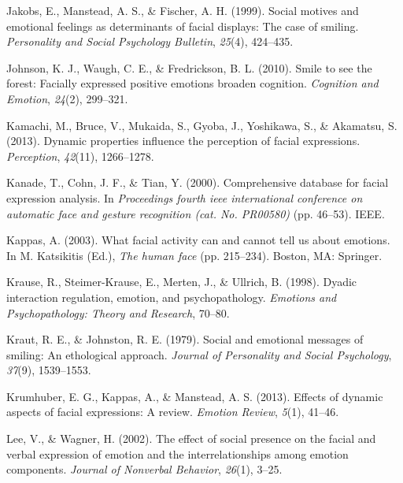 \documentclass[man]{apa6}
\begin{document}
\leavevmode\hypertarget{ref-jakobs1999social}{}%
Jakobs, E., Manstead, A. S., \& Fischer, A. H. (1999). Social motives and emotional feelings as determinants of facial displays: The case of smiling. \emph{Personality and Social Psychology Bulletin}, \emph{25}(4), 424--435.

\leavevmode\hypertarget{ref-johnson2010smile}{}%
Johnson, K. J., Waugh, C. E., \& Fredrickson, B. L. (2010). Smile to see the forest: Facially expressed positive emotions broaden cognition. \emph{Cognition and Emotion}, \emph{24}(2), 299--321.

\leavevmode\hypertarget{ref-kamachi2013dynamic}{}%
Kamachi, M., Bruce, V., Mukaida, S., Gyoba, J., Yoshikawa, S., \& Akamatsu, S. (2013). Dynamic properties influence the perception of facial expressions. \emph{Perception}, \emph{42}(11), 1266--1278.

\leavevmode\hypertarget{ref-kanade2000comprehensive}{}%
Kanade, T., Cohn, J. F., \& Tian, Y. (2000). Comprehensive database for facial expression analysis. In \emph{Proceedings fourth ieee international conference on automatic face and gesture recognition (cat. No. PR00580)} (pp. 46--53). IEEE.

\leavevmode\hypertarget{ref-kappas2003facial}{}%
Kappas, A. (2003). What facial activity can and cannot tell us about emotions. In M. Katsikitis (Ed.), \emph{The human face} (pp. 215--234). Boston, MA: Springer.

\leavevmode\hypertarget{ref-krause1998dyadic}{}%
Krause, R., Steimer-Krause, E., Merten, J., \& Ullrich, B. (1998). Dyadic interaction regulation, emotion, and psychopathology. \emph{Emotions and Psychopathology: Theory and Research}, 70--80.

\leavevmode\hypertarget{ref-kraut1979social}{}%
Kraut, R. E., \& Johnston, R. E. (1979). Social and emotional messages of smiling: An ethological approach. \emph{Journal of Personality and Social Psychology}, \emph{37}(9), 1539--1553.

\leavevmode\hypertarget{ref-krumhuber2013effects}{}%
Krumhuber, E. G., Kappas, A., \& Manstead, A. S. (2013). Effects of dynamic aspects of facial expressions: A review. \emph{Emotion Review}, \emph{5}(1), 41--46.

\leavevmode\hypertarget{ref-lee2002effect}{}%
Lee, V., \& Wagner, H. (2002). The effect of social presence on the facial and verbal expression of emotion and the interrelationships among emotion components. \emph{Journal of Nonverbal Behavior}, \emph{26}(1), 3--25.
\end{document}
